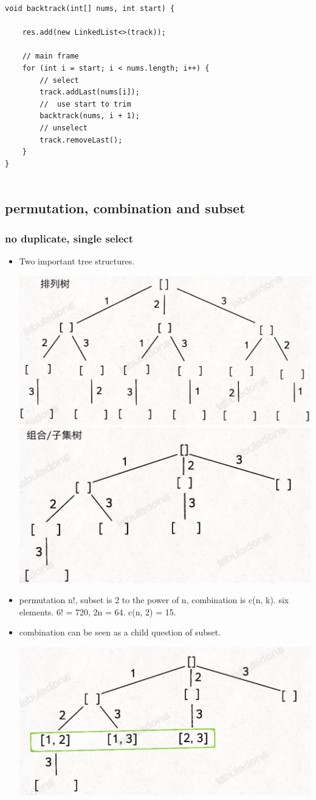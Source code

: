 \documentclass[a4paper,11pt,twoside]{book}
\begin{document}
\begin{itemize}
\begin{lstlisting}
void backtrack(int[] nums, int start) {
	
	res.add(new LinkedList<>(track));
	
	// main frame
	for (int i = start; i < nums.length; i++) {
		// select
		track.addLast(nums[i]);
		//  use start to trim
		backtrack(nums, i + 1);
		// unselect
		track.removeLast();
	}
}


\end{lstlisting}


\subsection{permutation, combination and subset}
\subsubsection{no duplicate, single select}
\begin{itemize}
	\item Two important tree structures.
\begin{center}
	\includegraphics[width=0.7\linewidth]{pics/per}
	\includegraphics[width=0.7\linewidth]{pics/com}
\end{center}

	\item permutation n!,  subset is 2 to the power of n,  combination is c(n, k). six elements.  6! = 720,  2n = 64.  c(n, 2) = 15. 
		
	\item combination can be seen as a child question of subset. 
	\begin{center}
		\includegraphics[width=0.7\linewidth]{pics/subset}
	\end{center}
	

\end{itemize}
\end{itemize}
\end{document}
